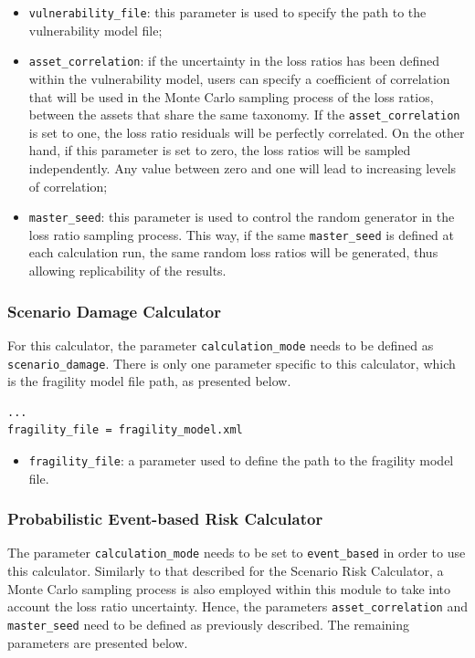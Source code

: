 \begin{itemize}
\item  \Verb+vulnerability_file+: this parameter is used to specify the path to the \gls{vulnerability model} file;
\item  \Verb+asset_correlation+: if the uncertainty in the loss ratios has been defined within the \gls{vulnerability model}, users can specify a coefficient of correlation that will be used in the Monte Carlo sampling process of the loss ratios, between the assets that share the same \gls{taxonomy}. If the \Verb+asset_correlation+ is set to one, the loss ratio residuals will be perfectly correlated. On the other hand, if this parameter is set to zero, the loss ratios will be sampled independently. Any value between zero and one will lead to increasing levels of correlation;
\item  \Verb+master_seed+: this parameter is used to control the random generator in the loss ratio sampling process. This way, if the same \Verb+master_seed+ is defined at each calculation run, the same random loss ratios will be generated, thus allowing replicability of the results.
\end{itemize}

\subsubsection{Scenario Damage Calculator}
For this calculator, the parameter \Verb+calculation_mode+ needs to be defined as \Verb+scenario_damage+. There is only one parameter specific to this calculator, which is the \gls{fragility model} file path, as presented below.

\begin{Verbatim}[frame=single, commandchars=\\\{\}, samepage=true]
...
fragility_file = fragility_model.xml
\end{Verbatim}

\begin{itemize}
\item  \Verb+fragility_file+: a parameter used to define the path to the \gls{fragility model} file.
\end{itemize}

\subsubsection{Probabilistic Event-based Risk Calculator}
The parameter \Verb+calculation_mode+ needs to be set to \Verb+event_based+ in order to use this calculator. Similarly to that described for the Scenario Risk Calculator, a Monte Carlo sampling process is also employed within this module to take into account the loss ratio uncertainty. Hence, the parameters \Verb+asset_correlation+ and \Verb+master_seed+ need to be defined as previously described. The remaining parameters are presented below.

